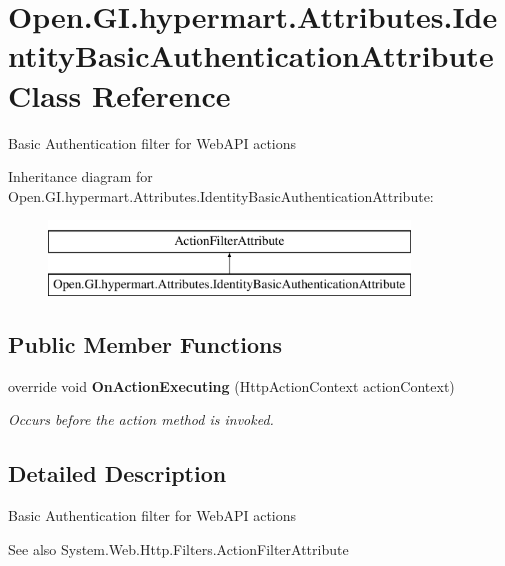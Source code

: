 \section{Open.\+G\+I.\+hypermart.\+Attributes.\+Identity\+Basic\+Authentication\+Attribute Class Reference}
\label{class_open_1_1_g_i_1_1hypermart_1_1_attributes_1_1_identity_basic_authentication_attribute}


Basic Authentication filter for Web\+A\+PI actions  


Inheritance diagram for Open.\+G\+I.\+hypermart.\+Attributes.\+Identity\+Basic\+Authentication\+Attribute\+:\begin{figure}[H]
\begin{center}
\leavevmode
\includegraphics[height=2.000000cm]{class_open_1_1_g_i_1_1hypermart_1_1_attributes_1_1_identity_basic_authentication_attribute}
\end{center}
\end{figure}
\subsection*{Public Member Functions}
\begin{DoxyCompactItemize}
\item 
override void \textbf{ On\+Action\+Executing} (Http\+Action\+Context action\+Context)
\begin{DoxyCompactList}\small\item\em Occurs before the action method is invoked. \end{DoxyCompactList}\end{DoxyCompactItemize}


\subsection{Detailed Description}
Basic Authentication filter for Web\+A\+PI actions 

\begin{DoxySeeAlso}{See also}
System.\+Web.\+Http.\+Filters.\+Action\+Filter\+Attribute


\end{DoxySeeAlso}



